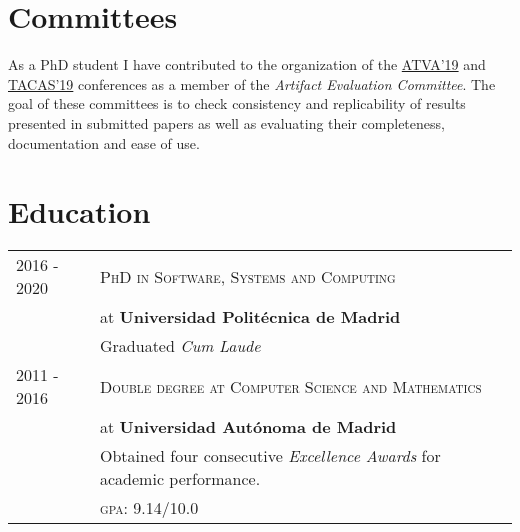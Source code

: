 \documentclass[a4paper,10pt]{article} %
\begin{document}
\section{Committees}
As a PhD student I have contributed to the organization of the \href{http://atva2019.iis.sinica.edu.tw/organization/}{ATVA'19} and \href{https://conf.researchr.org/track/etaps-2019/tacas-2019-papers#Artifact-Evaluation}{TACAS'19} conferences as a member of the \emph{Artifact Evaluation Committee}.
The goal of these committees is to check consistency and replicability of results presented in submitted papers as well as evaluating their completeness, documentation and ease of use.

\section{Education}
\begin{tabular}{p{2.5cm}p{13.2cm}}
\small{2016 - 2020} & \textsc{PhD in Software, Systems and Computing} \\
& at \textbf{Universidad Politécnica de Madrid}\\
& Graduated \emph{Cum Laude} \\
[3pt]
\small{2011 - 2016} & \textsc{Double degree at Computer Science and Mathematics}\\
& at \textbf{Universidad Autónoma de Madrid} \\
& Obtained four consecutive \emph{Excellence Awards} for academic performance. \\
& \normalsize \textsc{gpa}: 9.14/10.0
\end{tabular}
\end{document}
